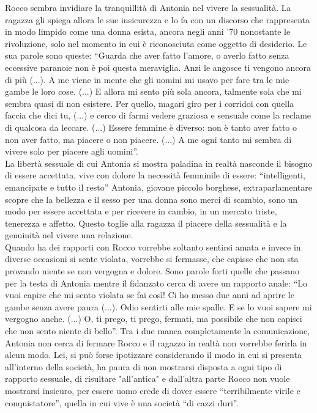 Rocco sembra invidiare la tranquillità di Antonia nel vivere la sessualità.
La ragazza gli spiega allora le sue insicurezza e lo fa con un discorso che rappresenta in modo limpido come una donna esista, ancora negli anni '70 nonostante le rivoluzione, solo nel momento in cui è riconosciuta come oggetto di desiderio.
Le sua parole sono queste: \enquote{Guarda che aver fatto l'amore, o averlo fatto senza eccessive paranoie non è poi questa meraviglia. Anzi le angosce ti vengono ancora di più (...). A me viene in mente che gli uomini mi usavo per fare tra le mie gambe le loro cose. (...) E allora mi sento più sola ancora, talmente sola che mi sembra quasi di non esistere. Per quello, magari giro per i corridoi con quella faccia che dici tu, (...) e cerco di farmi vedere graziosa e sensuale come la reclame di qualcosa da leccare. (...) Essere femmine è diverso: non è tanto aver fatto o non aver fatto, ma piacere o non piacere. (...) A me ogni tanto mi sembra di vivere solo per piacere agli uomini}.
\\La libertà sessuale di cui Antonia si mostra paladina in realtà nasconde il bisogno di essere accettata, vive con dolore la necessità femminile di essere: \enquote{intelligenti, emancipate e tutto il resto}
Antonia, giovane piccolo borghese, extraparlamentare scopre che la bellezza e il sesso per una donna sono merci di scambio, sono un modo per essere accettata e per ricevere in cambio, in un mercato triste, tenerezza e affetto.
Questo toglie alla ragazza il piacere della sessualità e la genuinità nel vivere una relazione.
\\Quando ha dei rapporti con Rocco vorrebbe soltanto sentirsi amata e invece in diverse occasioni si sente violata, vorrebbe si fermasse, che capisse che non sta provando niente se non vergogna e dolore.
Sono parole forti quelle che passano per la testa di Antonia mentre il fidanzato cerca di avere un rapporto anale: \enquote{Lo vuoi capire che mi sento violata se fai così! Ci ho messo due anni ad aprire le gambe senza avere paura (...). Odio sentirti alle mie spalle. E se lo vuoi sapere mi vergogno anche. (...) O, ti prego, ti prego, fermati, ma possibile che non capisci che non sento niente di bello}.
Tra i due manca completamente la comunicazione, Antonia non cerca di fermare Rocco e il ragazzo in realtà non vorrebbe ferirla in alcun modo.
Lei, si può forse ipotizzare considerando il modo in cui si presenta all'interno della società, ha paura di non mostrarsi disposta a ogni tipo di rapporto sessuale, di risultare "all'antica" e dall'altra parte Rocco non vuole mostrarsi insicuro, per essere uomo crede di dover essere \enquote{terribilmente virile e conquistatore}, quella in cui vive è una società \enquote{di cazzi duri}.


